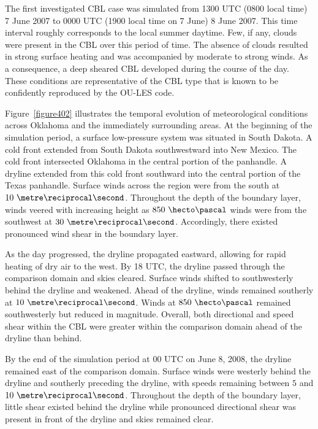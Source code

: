 The first investigated CBL case was simulated from 1300 UTC (0800 local time) 7 June 2007 to 0000 UTC (1900 local time on 7 June) 8 June 2007. This time interval roughly corresponds to the local summer daytime. Few, if any, clouds were present in the CBL over this period of time. The absence of clouds resulted in strong surface heating and was accompanied by moderate to strong winds. As a consequence, a deep sheared CBL developed during the course of the day. These conditions are representative of the CBL type that is known to be confidently reproduced by the OU-LES code. 

Figure~\ref{figure402} illustrates the temporal evolution of meteorological conditions across Oklahoma and the immediately surrounding areas. At the beginning of the simulation period, a surface low-pressure system was situated in South Dakota. A cold front extended from South Dakota southwestward into New Mexico. The cold front intersected Oklahoma in the central portion of the panhandle. A dryline extended from this cold front southward into the central portion of the Texas panhandle. Surface winds across the region were from the south at $10\mbox{ }\metre\reciprocal\second$. Throughout the depth of the boundary layer, winds veered with increasing height as $850\mbox{ }\hecto\pascal$ winds were from the southwest at $30\mbox{ }\metre\reciprocal\second$. Accordingly, there existed pronounced wind shear in the boundary layer. 

As the day progressed, the dryline propagated eastward, allowing for rapid heating of dry air to the west. By 18 UTC, the dryline passed through the comparison domain and skies cleared. Surface winds shifted to southwesterly behind the dryline and weakened. Ahead of the dryline, winds remained southerly at $10\mbox{ }\metre\reciprocal\second$. Winds at $850\mbox{ }\hecto\pascal$ remained southwesterly but reduced in magnitude. Overall, both directional and speed shear within the CBL were greater within the comparison domain ahead of the dryline than behind.

By the end of the simulation period at 00 UTC on June 8, 2008, the dryline remained east of the comparison domain. Surface winds were westerly behind the dryline and southerly preceding the dryline, with speeds remaining between $5$ and $10\mbox{ }\metre\reciprocal\second$. Throughout the depth of the boundary layer, little shear existed behind the dryline while pronounced directional shear was present in front of the dryline and skies remained clear.

